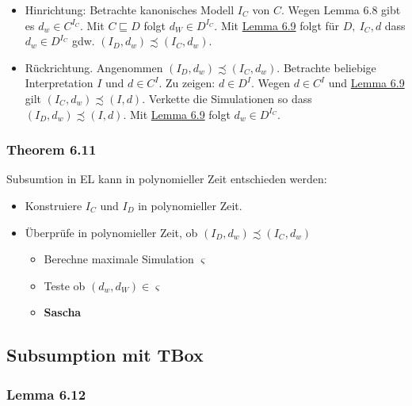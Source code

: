 \begin{itemize}
\item
  Hinrichtung: Betrachte kanonisches Modell $I_{C}$ von $C$. Wegen
  Lemma 6.8 gibt es $d_{w} \in C^{I_{C}}$. Mit $C \sqsubseteq D$
  folgt $d_{W} \in D^{I_{C}}$. Mit \protect\hyperlink{lemma-6.9}{Lemma
  6.9} folgt für $D,\ I_{C},d$ dass $d_{w} \in D^{I_{C}}$ gdw.
  $\left( I_{D},d_{w} \right) \precsim \left( I_{C},d_{w} \right)$.
\item
  Rückrichtung. Angenommen
  $\left( I_{D},d_{w} \right) \precsim \left( I_{C},d_{w} \right)$.
  Betrachte beliebige Interpretation $I$ und $d \in C^{I}$. Zu
  zeigen: $d \in D^{I}$. Wegen $d \in C^{I}$ und
  \protect\hyperlink{lemma-6.9}{Lemma 6.9} gilt
  $\left( I_{C},d_{w} \right) \precsim \left( I,d \right)$. Verkette
  die Simulationen so dass
  $\left( I_{D},d_{w} \right) \precsim \left( I,d \right)$. Mit
  \protect\hyperlink{lemma-6.9}{Lemma 6.9} folgt
  $d_{w} \in D^{I_{C}}$.
\end{itemize}

\subsubsection{Theorem 6.11}\label{theorem-6.11}

Subsumtion in EL kann in polynomieller Zeit entschieden werden:

\begin{itemize}
\item
  Konstruiere $I_{C}$ und $I_{D}$ in polynomieller Zeit.
\item
  Überprüfe in polynomieller Zeit, ob
  $\left( I_{D},d_{w} \right) \precsim \left( I_{C},d_{w} \right)$

  \begin{itemize}
  \item
    Berechne maximale Simulation $\varsigma$
  \item
    Teste ob $\left( d_{w},d_{W} \right) \in \varsigma$
  \item
    \textbf{Sascha}
  \end{itemize}
\end{itemize}

\subsection{Subsumption mit TBox}\label{subsumption-mit-tbox}

\subsubsection{Lemma 6.12}\label{lemma-6.12}

